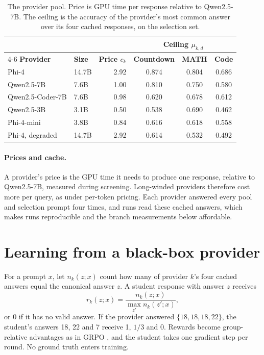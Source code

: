 \begin{table}[htbp]
\centering
\small
\begin{tabular}{@{}llrccc@{}}
\toprule
 & & & \multicolumn{3}{c}{\textbf{Ceiling $\mu_{k,d}$}} \\
\cmidrule(l){4-6}
\textbf{Provider} & \textbf{Size} & \textbf{Price $c_k$} & \textbf{Countdown} &
  \textbf{MATH} & \textbf{Code} \\
\midrule
Phi-4 \autocite{abdin_phi4_2024}                 & 14.7B & 2.92 & 0.874 & 0.804 & 0.686 \\
Qwen2.5-7B \autocite{qwen_qwen25_2024}           & 7.6B  & 1.00 & 0.810 & 0.750 & 0.580 \\
Qwen2.5-Coder-7B \autocite{hui_qwen25coder_2024} & 7.6B  & 0.98 & 0.620 & 0.678 & 0.612 \\
Qwen2.5-3B \autocite{qwen_qwen25_2024}           & 3.1B  & 0.50 & 0.538 & 0.690 & 0.462 \\
Phi-4-mini \autocite{microsoft_phi4mini_2025}    & 3.8B  & 0.84 & 0.616 & 0.618 & 0.558 \\
Phi-4, degraded                                  & 14.7B & 2.92 & 0.614 & 0.532 & 0.492 \\
\bottomrule
\end{tabular}
\caption{The provider pool. Price is GPU time per response relative to Qwen2.5-7B. The
ceiling is the accuracy of the provider's most common answer over its four cached
responses, on the selection set.}
\label{ca:tab:pool}
\end{table}

\paragraph{Prices and cache.} A provider's price is the GPU time it needs to produce one
response, relative to Qwen2.5-7B, measured during screening. Long-winded providers
therefore cost more per query, as under per-token pricing. Each provider answered every
pool and selection prompt four times, and runs read these cached answers, which makes runs
reproducible and the branch measurements below affordable.

\section{Learning from a black-box provider}

For a prompt $x$, let $n_k(z; x)$ count how many of provider $k$'s four cached answers
equal the canonical answer $z$. A student response with answer $z$ receives
\[
  r_k(z; x) = \frac{n_k(z; x)}{\max_{z'} n_k(z'; x)},
\]
or 0 if it has no valid answer. If the provider answered $\{18, 18, 18, 22\}$, the
student's answers 18, 22 and 7 receive 1, $1/3$ and 0. Rewards become group-relative
advantages as in GRPO \autocite{shao_deepseekmath_grpo_2024}, and the student takes one
gradient step per round. No ground truth enters training.

